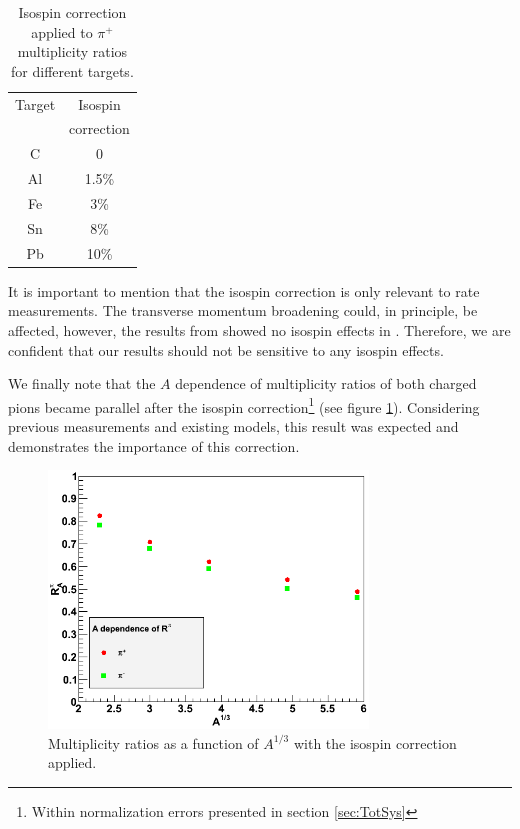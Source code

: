 \begin{table}[htbp]
  \centering
  \begin{tabular}{@{} cc @{}}
    \hline
    Target & Isospin  \\ 
           & correction \\ 
    \hline
    C & 0 \\
    Al & 1.5\%\\
    Fe &  3\% \\
    Sn &  8\%\\
    Pb &  10\% \\
    \hline
  \end{tabular}
  \caption{Isospin correction applied to $\pi^+$ multiplicity ratios for different targets.}
  \label{tab:isospin}
\end{table}

It is important to mention that the isospin correction is only relevant to 
rate measurements. The transverse momentum broadening could, in principle, 
be affected, however, the results from \cite{Asaturyan:2011mq} showed no 
isospin effects in \ptp. Therefore, we are confident that our \dpt results 
should not be sensitive to any isospin effects.

We finally note that the $A$ dependence of multiplicity ratios of both 
charged pions became parallel after the isospin correction\footnote{Within 
normalization errors presented in section \ref{sec:TotSys}} (see figure 
\ref{fig:IsoPlot}). Considering previous measurements and existing models, 
this result was expected and demonstrates the importance of this correction.

\begin{figure}[tbp]
\centering
\includegraphics[width=8.5cm] {chap5-fig/c_RvA.png}
\caption {Multiplicity ratios as a function of $A^{1/3}$ with the isospin correction applied.}
\label{fig:IsoPlot}
\end{figure}

